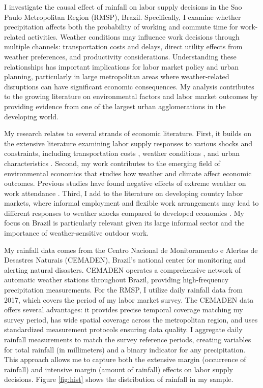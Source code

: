 I investigate the causal effect of rainfall on labor supply decisions in the Sao Paulo Metropolitan Region (RMSP), Brazil. Specifically, I examine whether precipitation affects both the probability of working and commute time for work-related activities. Weather conditions may influence work decisions through multiple channels: transportation costs and delays, direct utility effects from weather preferences, and productivity considerations. Understanding these relationships has important implications for labor market policy and urban planning, particularly in large metropolitan areas where weather-related disruptions can have significant economic consequences. My analysis contributes to the growing literature on environmental factors and labor market outcomes by providing evidence from one of the largest urban agglomerations in the developing world.

My research relates to several strands of economic literature. First, it builds on the extensive literature examining labor supply responses to various shocks and constraints, including transportation costs \citep{zenou2001}, weather conditions \citep{connolly2008JLaborEcon}, and urban characteristics \citep{moretti2011local}. Second, my work contributes to the emerging field of environmental economics that studies how weather and climate affect economic outcomes. Previous studies have found negative effects of extreme weather on work attendance \citep{somanathan2021impact}. Third, I add to the literature on developing country labor markets, where informal employment and flexible work arrangements may lead to different responses to weather shocks compared to developed economies \citep{branco2021AmericanJAgriEconomics}. My focus on Brazil is particularly relevant given its large informal sector and the importance of weather-sensitive outdoor work.

My rainfall data comes from the Centro Nacional de Monitoramento e Alertas de Desastres Naturais (CEMADEN), Brazil's national center for monitoring and alerting natural disasters. CEMADEN operates a comprehensive network of automatic weather stations throughout Brazil, providing high-frequency precipitation measurements. For the RMSP, I utilize daily rainfall data from 2017, which covers the period of my labor market survey. The CEMADEN data offers several advantages: it provides precise temporal coverage matching my survey period, has wide spatial coverage across the metropolitan region, and uses standardized measurement protocols ensuring data quality. I aggregate daily rainfall measurements to match the survey reference periods, creating variables for total rainfall (in millimeters) and a binary indicator for any precipitation. This approach allows me to capture both the extensive margin (occurrence of rainfall) and intensive margin (amount of rainfall) effects on labor supply decisions. Figure \ref{fig:hist} shows the distribution of rainfall in my sample.

